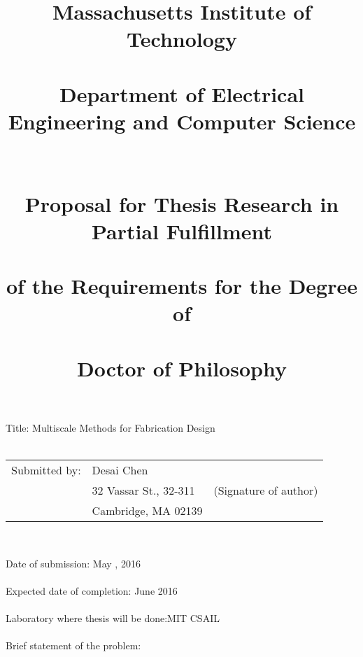 \documentclass[11pt]{article}
\title{ \large{Massachusetts Institute of Technology\\~\\
	Department of Electrical Engineering and Computer Science\\~\\~\\
	Proposal for Thesis Research in Partial Fulfillment\\~\\
	of the Requirements for the Degree of\\~\\
	Doctor of Philosophy }}
\date{}
\begin{document}
	\maketitle
\begin{flushleft}
 Title: Multiscale Methods for Fabrication Design\\~\\
\end{flushleft} 
\hskip-0.2cm\begin{tabular}{p{4cm} p{6cm} p{8cm}}
 	 Submitted by: & Desai Chen & \underline{\hspace{6cm}}\\
                   &32 Vassar St., 32-311 & (Signature of author) 	  \\
                   &Cambridge, MA 02139&
\end{tabular}\\
\begin{flushleft}
Date of submission: May , 2016\\~\\
Expected date of completion: June 2016\\~\\
Laboratory where thesis will be done:MIT CSAIL\\~\\
Brief statement of the problem:\\~\\


\end{flushleft}
\end{document}
